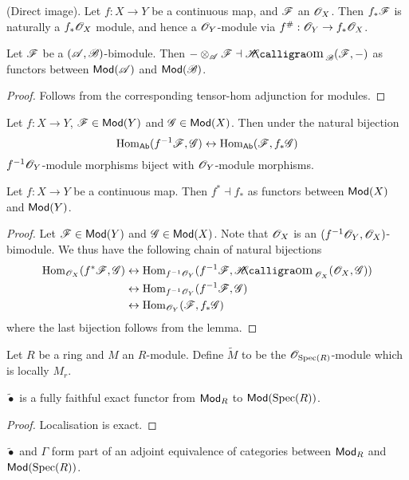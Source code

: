 \documentclass{memoir}
\begin{document}
\begin{definition}
    (Direct image).
    Let $f:X\to Y$ be a continuous map, and $\mathscr{F}$ an $\mathscr{O}_X$.
    Then $f_*\mathscr{F}$ is naturally a $f_*\mathscr{O}_X$ module, and hence a $\mathscr{O}_Y$-module via $f^\#:\mathscr{O}_Y\to f_*\mathscr{O}_X$.
\end{definition}
\begin{thm}
    \label{thm:tensor-hom}
    Let $\mathscr{F}$ be a $(\mathscr{A},\mathscr{B})$-bimodule.
    Then $-\otimes_{\shf{A}}\shf{F}\dashv \sheafHom_{\shf{B}}(\shf{F},-)$ as functors between ${\normalfont\mathsf{Mod}}(\mathscr{A})$ and ${\normalfont\mathsf{Mod}}(\mathscr{B})$.
\end{thm}
\begin{proof}
    Follows from the corresponding tensor-hom adjunction for modules.
\end{proof}
\begin{lemma}
    Let $f:X\to Y$, $\mathscr{F}\in {\normalfont\mathsf{Mod}}(Y)$ and $\mathscr{G}\in {\normalfont\mathsf{Mod}}(X)$.
    Then under the natural bijection
    \begin{equation}
        \operatorname{Hom}_{\normalfont\mathsf{Ab}}(f^{-1}\mathscr{F},\mathscr{G}) \leftrightarrow \operatorname{Hom}_{\normalfont\mathsf{Ab}}(\mathscr{F},f_*\mathscr{G})
    \end{equation}
    $f^{-1}\mathscr{O}_Y$-module morphisms biject with $\mathscr{O}_Y$-module morphisms.
\end{lemma}
\begin{thm}
    Let $f:X\to Y$ be a continuous map. 
    Then $f^*\dashv f_*$ as functors between ${\normalfont\mathsf{Mod}}(X)$ and ${\normalfont\mathsf{Mod}}(Y)$.
\end{thm}
\begin{proof}
    Let $\mathscr{F}\in {\normalfont\mathsf{Mod}}(Y)$ and $\mathscr{G}\in {\normalfont\mathsf{Mod}}(X)$.
    Note that $\mathscr{O}_X$ is an $(f^{-1}\mathscr{O}_Y,\mathscr{O}_X)$-bimodule.
    We thus have the following chain of natural bijections
    \begin{align}
        \Hom_{\shf{O}_X}(f^*\shf{F},\shf{G}) &\leftrightarrow \Hom_{f^{-1}\shf{O}_Y}(f^{-1}\shf{F},\sheafHom_{\shf{O}_X}(\shf{O}_X,\shf{G})) \nonumber \\
                                             &\leftrightarrow \Hom_{f^{-1}\shf{O}_Y}(f^{-1}\shf{F},\shf{G}) \nonumber \\
                                             &\leftrightarrow \Hom_{\shf{O}_Y}(\shf{F},f_*\shf{G})
    \end{align}
    where the last bijection follows from the lemma.
\end{proof}
\begin{definition}
    Let $R$ be a ring and $M$ an $R$-module. 
    Define $\tilde M$ to be the $\mathscr{O}_{\operatorname{Spec}(R)}$-module which is locally $M_r$.
\end{definition}
\begin{thm}
    $\tilde \bullet$ is a fully faithful exact functor from ${\normalfont\mathsf{Mod}}_R$ to ${\normalfont\mathsf{Mod}}(\operatorname{Spec}(R))$.
\end{thm}
\begin{proof}
    Localisation is exact.
\end{proof}
\begin{corollary}
    $\tilde \bullet$ and $\Gamma$ form part of an adjoint equivalence of categories between ${\normalfont\mathsf{Mod}}_R$ and ${\normalfont\mathsf{Mod}}(\operatorname{Spec}(R))$.
\end{corollary}
\end{document}
